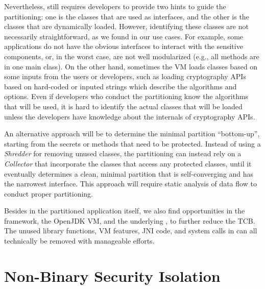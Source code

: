 Nevertheless, \civet{} still requires developers to provide two hints
to guide the partitioning:
one is the classes that are used as interfaces,
and the other is the classes that are dynamically loaded.
However, identifying these classes are not necessarily straightforward,
as we found in our use cases.
For example, some applications do not have the obvious interfaces
to interact with the sensitive components,
or, in the worst case, are not well modularized (e.g., all methods are in one main class).
On the other hand,
sometimes the \java{} VM loads classes based on some inputs from the users or developers,
such as loading cryptography APIs based on hard-coded or inputed strings
which describe the algorithms and options.
Even if developers who conduct the partitioning know the algorithms that will be used,
it is hard to identify the actual classes that will be loaded
unless the developers have knowledge about the internals of cryptography APIs.


An alternative approach will be to determine the minimal partition ``bottom-up'',
starting from the secrets or methods that need to be protected.
Instead of using a \emph{Shredder} for removing unused classes,
the partitioning can instead rely on a \emph{Collector} that incorporate the classes
that access any protected classes,
until it eventually determines a clean,
minimal partition
that is self-converging and has the narrowest interface.
This approach will require static analysis of data flow to conduct proper partitioning.

Besides in the partitioned application itself,
we also find opportunities in the \civet{} framework, the OpenJDK \java{} VM,
and the underlying \graphene{} \libos{},
to further reduce the TCB.
The unused library functions, \java{} VM features, JNI code, and system calls in \graphene{}
can all technically be removed with manageable efforts.


\section{Non-Binary Security Isolation}
\label{sec:future:non-binary}



